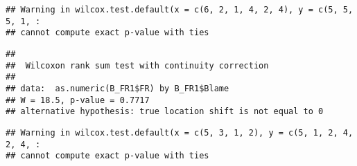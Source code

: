 \documentclass[
]{article}
\newenvironment{Shaded}{\begin{snugshade}}{\end{snugshade}}
\newcommand{\CommentTok}[1]{\textcolor[rgb]{0.56,0.35,0.01}{\textit{#1}}}
\newcommand{\DecValTok}[1]{\textcolor[rgb]{0.00,0.00,0.81}{#1}}
\newcommand{\KeywordTok}[1]{\textcolor[rgb]{0.13,0.29,0.53}{\textbf{#1}}}
\newcommand{\NormalTok}[1]{#1}
\newcommand{\OperatorTok}[1]{\textcolor[rgb]{0.81,0.36,0.00}{\textbf{#1}}}
\newcommand{\StringTok}[1]{\textcolor[rgb]{0.31,0.60,0.02}{#1}}
\begin{document}
\begin{Shaded}
\end{Shaded}

\begin{verbatim}
## Warning in wilcox.test.default(x = c(6, 2, 1, 4, 2, 4), y = c(5, 5, 5, 1, :
## cannot compute exact p-value with ties
\end{verbatim}

\begin{verbatim}
## 
##  Wilcoxon rank sum test with continuity correction
## 
## data:  as.numeric(B_FR1$FR) by B_FR1$Blame
## W = 18.5, p-value = 0.7717
## alternative hypothesis: true location shift is not equal to 0
\end{verbatim}

\begin{Shaded}
\end{Shaded}

\begin{verbatim}
## Warning in wilcox.test.default(x = c(5, 3, 1, 2), y = c(5, 1, 2, 4, 2, 4, :
## cannot compute exact p-value with ties
\end{verbatim}
\end{document}
